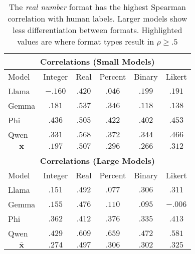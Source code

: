 \renewcommand{\arraystretch}{1.3}
\begin{table}[t]
\centering
\small
\begin{tabular}{|l|c|c|c|c|c|}
\multicolumn{6}{c}{\textbf{Correlations (Small Models)}} \\
\hline
\cellcolor{lightgray}Model & \cellcolor{lightgray}Integer & \cellcolor{lightgray}Real & \cellcolor{lightgray}Percent & \cellcolor{lightgray}Binary & \cellcolor{lightgray}Likert \\
\hline
\hline
Llama & $-.160$ & $.420$ & $.046$ & $.199$ & $.191$ \\
\hline
Gemma & $.181$ & $\mathbf{.537}$ & $.346$ & $.118$ & $.138$ \\
\hline
Phi & $.436$ & $\mathbf{.505}$ & $.422$ & $.402$ & $.453$ \\
\hline
Qwen & $.331$ & $\mathbf{.568}$ & $.372$ & $.344$ & $.466$ \\
\hline
\hline
\multicolumn{1}{|c|}{\cellcolor{lightgray}\textbf{$\mathbf{\bar{x}}$}} & $.197$ & $.507$ & $.296$ & $.266$ & $.312$ \\
\hline
\multicolumn{1}{c}{}\\
\multicolumn{6}{c}{\textbf{Correlations (Large Models)}} \\
\hline
\cellcolor{lightgray}Model & \cellcolor{lightgray}Integer & \cellcolor{lightgray}Real & \cellcolor{lightgray}Percent & \cellcolor{lightgray}Binary & \cellcolor{lightgray}Likert \\
\hline
\hline
Llama & $.151$ & $.492$ & $.077$ & $.306$ & $.311$ \\
\hline
Gemma & $.155$ & $.476$ & $.110$ & $.095$ & $-.006$ \\
\hline
Phi & $.362$ & $.412$ & $.376$ & $.335$ & $.413$ \\
\hline
Qwen & $.429$ & $\mathbf{.609}$ & $\mathbf{.659}$ & $.472$ & $\mathbf{.581}$ \\
\hline
\hline
\multicolumn{1}{|c|}{\cellcolor{lightgray}\textbf{$\mathbf{\bar{x}}$}} & $.274$ & $.497$ & $.306$ & $.302$ & $.325$ \\
\hline
\end{tabular}
\caption{The \textit{real number} format has the highest Spearman correlation with human labels. Larger models show less differentiation between formats. Highlighted values are where format types result in $\rho\geq.5$}
\label{tab:model-correlations}
\end{table}